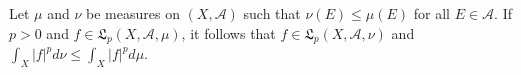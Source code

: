 Let $\mu$ and $\nu$ be measures on $(X, \mathcal{A})$ such that $\nu(E) \le \mu(E)$ for all $E \in \mathcal{A}$. If $p > 0$ and $f \in \mathfrak{L}_p(X, \mathcal{A}, \mu)$, it follows that $f \in \mathfrak{L}_p(X, \mathcal{A}, \nu)$ and $\int_X |f|^p d\nu \le \int_X |f|^p d\mu$.